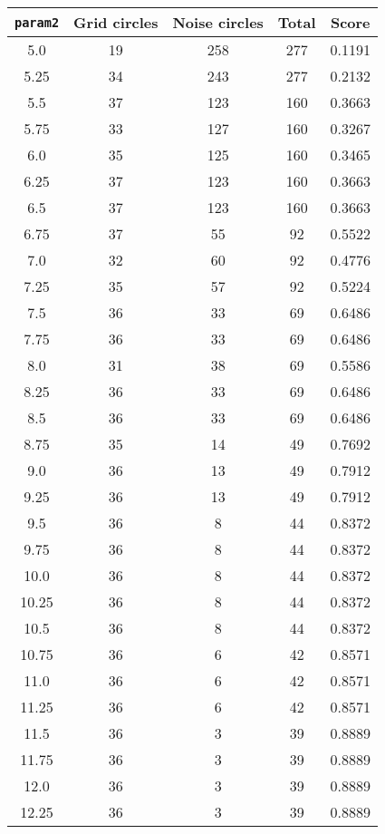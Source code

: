 \documentclass[letterpaper, 12pt]{article}
\begin{document}
\begin{longtable}{|c|c|c|c|c|}
\hline
\textbf{\texttt{param2}} & \textbf{Grid circles} & \textbf{Noise circles} & \textbf{Total} & \textbf{Score} \\
\hline
5.0 & 19 & 258 & 277 & 0.1191 \\
\hline
5.25 & 34 & 243 & 277 & 0.2132 \\
\hline
5.5 & 37 & 123 & 160 & 0.3663 \\
\hline
5.75 & 33 & 127 & 160 & 0.3267 \\
\hline
6.0 & 35 & 125 & 160 & 0.3465 \\
\hline
6.25 & 37 & 123 & 160 & 0.3663 \\
\hline
6.5 & 37 & 123 & 160 & 0.3663 \\
\hline
6.75 & 37 & 55 & 92 & 0.5522 \\
\hline
7.0 & 32 & 60 & 92 & 0.4776 \\
\hline
7.25 & 35 & 57 & 92 & 0.5224 \\
\hline
7.5 & 36 & 33 & 69 & 0.6486 \\
\hline
7.75 & 36 & 33 & 69 & 0.6486 \\
\hline
8.0 & 31 & 38 & 69 & 0.5586 \\
\hline
8.25 & 36 & 33 & 69 & 0.6486 \\
\hline
8.5 & 36 & 33 & 69 & 0.6486 \\
\hline
8.75 & 35 & 14 & 49 & 0.7692 \\
\hline
9.0 & 36 & 13 & 49 & 0.7912 \\
\hline
9.25 & 36 & 13 & 49 & 0.7912 \\
\hline
9.5 & 36 & 8 & 44 & 0.8372 \\
\hline
9.75 & 36 & 8 & 44 & 0.8372 \\
\hline
10.0 & 36 & 8 & 44 & 0.8372 \\
\hline
10.25 & 36 & 8 & 44 & 0.8372 \\
\hline
10.5 & 36 & 8 & 44 & 0.8372 \\
\hline
10.75 & 36 & 6 & 42 & 0.8571 \\
\hline
11.0 & 36 & 6 & 42 & 0.8571 \\
\hline
11.25 & 36 & 6 & 42 & 0.8571 \\
\hline
11.5 & 36 & 3 & 39 & 0.8889 \\
\hline
11.75 & 36 & 3 & 39 & 0.8889 \\
\hline
12.0 & 36 & 3 & 39 & 0.8889 \\
\hline
12.25 & 36 & 3 & 39 & 0.8889 \\
\hline

\end{longtable}
\end{document}
